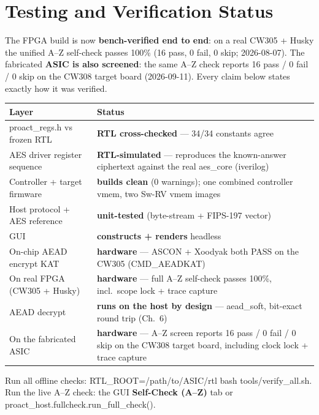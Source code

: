 \documentclass[11pt,a4paper]{report}
\newcommand{\code}[1]{{\ttfamily\small #1}}
\begin{document}
\chapter{Testing and Verification Status}
\begin{notebox}
The FPGA build is now \textbf{bench-verified end to end}: on a real CW305 +
Husky the unified A--Z self-check passes 100\% (16 pass, 0 fail, 0 skip;
2026-08-07). The fabricated \textbf{ASIC is also screened}: the same A--Z check
reports 16 pass / 0 fail / 0 skip on the CW308 target board (2026-09-11).
Every claim below states exactly how it was verified.
\end{notebox}
\begin{center}
\begin{longtable}{p{6.6cm}p{7.4cm}}
\toprule
Layer & Status \\ \midrule\endhead
\code{proact\_regs.h} vs frozen RTL & \textbf{RTL cross-checked} --- 34/34 constants agree \\
AES driver register sequence & \textbf{RTL-simulated} --- reproduces the known-answer ciphertext against the real \code{aes\_core} (iverilog) \\
Controller + target firmware & \textbf{builds clean} (0 warnings); one combined controller vmem, two Sw-RV vmem images \\
Host protocol + AES reference & \textbf{unit-tested} (byte-stream + FIPS-197 vector) \\
GUI & \textbf{constructs + renders} headless \\
On-chip AEAD encrypt KAT & \textbf{hardware} --- ASCON + Xoodyak both PASS on the CW305 (\code{CMD\_AEADKAT}) \\
On real FPGA (CW305 + Husky) & \textbf{hardware} --- full A--Z self-check passes 100\%, incl.\ scope lock + trace capture \\
AEAD decrypt & \textbf{runs on the host by design} --- \code{aead\_soft}, bit-exact round trip (Ch.~6) \\
On the fabricated ASIC & \textbf{hardware} --- A--Z screen reports 16 pass / 0 fail / 0 skip on the CW308 target board, including clock lock + trace capture \\
\bottomrule
\end{longtable}\end{center}
Run all offline checks: \code{RTL\_ROOT=/path/to/ASIC/rtl bash tools/verify\_all.sh}.
Run the live A--Z check: the GUI \textbf{Self-Check (A--Z)} tab or
\code{proact\_host.fullcheck.run\_full\_check()}.
\end{document}

